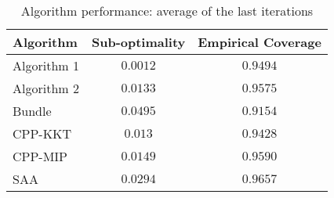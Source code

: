 \begin{table}[ht]
    \centering
    \begin{tabular}{lcc}
    \toprule
    \textbf{Algorithm} & \textbf{Sub-optimality} & \textbf{Empirical Coverage} \\
    \midrule
    Algorithm 1 & $0.0012$ & $0.9494$ \\
Algorithm 2 & $0.0133$ & $0.9575$ \\
Bundle & $0.0495$ & $0.9154$ \\
CPP-KKT & $0.013$ & $0.9428$ \\
CPP-MIP & $0.0149$ & $0.9590$ \\
SAA & $0.0294$ & $0.9657$ \\
\bottomrule
    \end{tabular}
    \caption{Algorithm performance: average of the last iterations}
    \end{table}